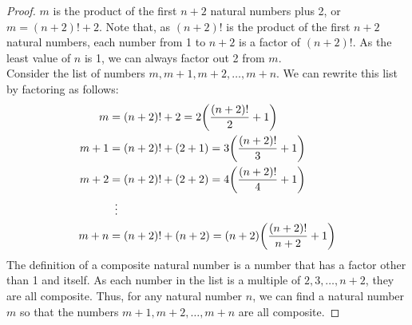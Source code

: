 \documentclass[article, 12pt]{article}
\theoremstyle{definition}
\DeclarePairedDelimiter\paren{(}{)} %
\begin{document}
    \begin{proof}
        $m$ is the product of the first $n+2$ natural numbers plus 2, or $m = (n+2)! + 2$. Note that, as $(n+2)!$ is the product of the first $n+2$ natural numbers, each number from 1 to $n+2$ is a factor of $(n+2)!$. As the least value of $n$ is 1, we can always factor out 2 from $m$.
        \\[12pt]
        Consider the list of numbers $m, m+1, m+2, \dots, m+n$. We can rewrite this list by factoring as follows:
        \begin{align*}
            m &= (n+2)! + 2 = 2\paren*{\frac{(n+2)!}{2} + 1} \\
            m+1 &= (n+2)! + (2+1) = 3\paren*{\frac{(n+2)!}{3} + 1} \\
            m+2 &= (n+2)! + (2+2) = 4\paren*{\frac{(n+2)!}{4} + 1} \\
            &\vdotswithin{=} \\
            m+n &= (n+2)! + (n+2) = (n+2)\paren*{\frac{(n+2)!}{n+2} + 1}
        \end{align*}
        The definition of a composite natural number is a number that has a factor other than 1 and itself. As each number in the list is a multiple of $2,3,\dots, n+2$, they are all composite. Thus, for any natural number $n$, we can find a natural number $m$ so that the numbers $m+1,m+2,\dots,m+n$ are all composite. 
    \end{proof}
\end{document}
